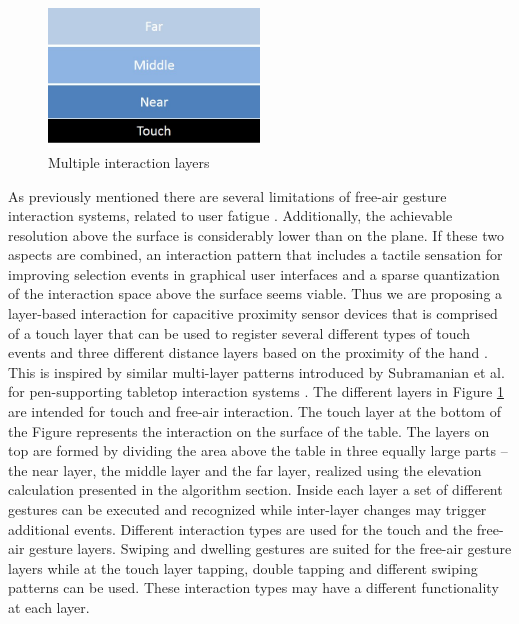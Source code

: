 \begin{figure}[ht]
\centering
\includegraphics[width=0.5\textwidth]{images/captap_layer_interaction}
\caption{Multiple interaction layers}
\label{fig:captap_layer_interaction}
\end{figure}

As previously mentioned there are several limitations of free-air gesture interaction systems, related to user fatigue \cite{Baudel1993,lenman2002}. Additionally, the achievable resolution above the surface is considerably lower than on the plane. If these two aspects are combined, an interaction pattern that includes a tactile sensation for improving selection events in graphical user interfaces and a sparse quantization of the interaction space above the surface seems viable. Thus we are proposing a layer-based interaction for capacitive proximity sensor devices that is comprised of a touch layer that can be used to register several different types of touch events and three different distance layers based on the proximity of the hand \cite{Braun2013captap}. This is inspired by similar multi-layer patterns introduced by Subramanian et al. for pen-supporting tabletop interaction systems \cite{subramanian2006multi}. The different layers in Figure \ref{fig:captap_layer_interaction} are intended for touch and free-air interaction. The touch layer at the bottom of the Figure represents the interaction on the surface of the table. The layers on top are formed by dividing the area above the table in three equally large parts – the near layer, the middle layer and the far layer, realized using the elevation calculation presented in the algorithm section. Inside each layer a set of different gestures can be executed and recognized while inter-layer changes may trigger additional events. Different interaction types are used for the touch and the free-air gesture layers. Swiping and dwelling gestures are suited for the free-air gesture layers while at the touch layer tapping, double tapping and different swiping patterns can be used. These interaction types may have a different functionality at each layer.
